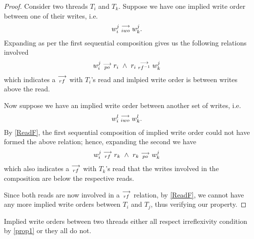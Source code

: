    \begin{proof}
        Consider two threads $T_i$ and $T_k$. Suppose we have one implied write order between one of their writes, i.e. 
        \begin{align}
            w_i^j\stackrel{\longrightarrow}{_{iwo}}w_k^j.    
        \end{align}
        Expanding as per the first sequential composition gives us the following relations involved
        \begin{align}
            w_i^j\stackrel{\longrightarrow}{_{po}}r_i \ \wedge \ r_i\stackrel{\longrightarrow}{_{rf^{-1}}}w_k^j 
        \end{align}
        which indicates a $\stackrel{\longrightarrow}{_{rf}}$ with $T_i$'s read and imlpied write order is between writes above the read. 

        Now suppose we have an implied write order between another set of writes, i.e.
        \begin{align}
            w_i^l\stackrel{\longrightarrow}{_{iwo}}w_k^l.    
        \end{align}
        By \ref{ReadF}, the first sequential composition of implied write order could not have formed the above relation; hence, expanding the second we have
        \begin{align}
            w_i^j\stackrel{\longrightarrow}{_{rf}}r_k \ \wedge \ r_k\stackrel{\longrightarrow}{_{po}}w_k^j
        \end{align}  
        which also indicates a $\stackrel{\longrightarrow}{_{rf}}$ with $T_k$'s read that the writes involved in the composition are below the respective reads.

        Since both reads are now involved in a $\stackrel{\longrightarrow}{_{rf}}$ relation, by \ref{ReadF}, we cannot have any more implied write orders between $T_i$ and $T_j$, thus verifying our property. 

    \end{proof}
        

    \begin{property}
        \label{prop5}
        Implied write orders between two threads either all respect irreflexivity condition by \ref{prop1} or they all do not.  
    \end{property}

